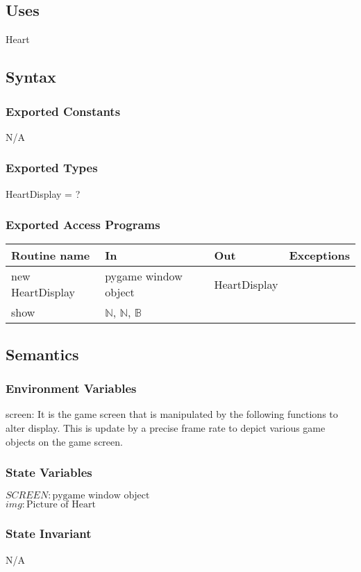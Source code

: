 \documentclass[12pt]{article}
\begin{document}
\subsection*{Uses}
Heart

\subsection*{Syntax}
\subsubsection*{Exported Constants}
N/A
\subsubsection*{Exported Types}
HeartDisplay = ?
\subsubsection*{Exported Access Programs}

\begin{tabular}{| l | l | l | l |}
\hline
\textbf{Routine name} & \textbf{In} & \textbf{Out} & \textbf{Exceptions}\\
\hline
new HeartDisplay       &pygame window object&     HeartDisplay        &           \\
\hline
show       &	 $\mathbb{N}$, $\mathbb{N}$, $\mathbb{B}$    &           &          \\
\hline
\end{tabular}

\subsection*{Semantics}
\subsubsection*{Environment Variables}
screen: It is the game screen that is manipulated by the following functions to alter display. This is update by a precise frame rate to depict various game objects on the game screen.
\subsubsection*{State Variables}
$SCREEN : \text{pygame window object}$\\
$img : \text{Picture of Heart}$
\subsubsection*{State Invariant}
N/A
\end{document}
